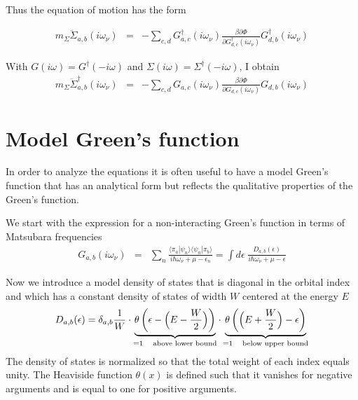\documentclass[11pt,a4paper]{report}
\begin{document}
Thus the equation of motion has the form

\begin{eqnarray*}
m_\Sigma
\ddot{\Sigma}_{a,b}(i\omega_\nu)
&=&-
\sum_{c,d}
G^\dagger_{a,c}(i\omega_\nu)
\frac{\beta\partial\Phi}{\partial G^\dagger_{d,c}(i\omega_\nu)}
G^\dagger_{d,b}(i\omega_\nu)
\end{eqnarray*}

With $G(i\omega)=G^\dagger(-i\omega)$ and
$\Sigma(i\omega)=\Sigma^\dagger(-i\omega)$, I obtain
\begin{eqnarray*}
m_\Sigma
\ddot{\Sigma}^\dagger_{a,b}(i\omega_\nu)
&=&-
\sum_{c,d}
G_{a,c}(i\omega_\nu)
\frac{\beta\partial\Phi}{\partial G_{d,c}(i\omega_\nu)}
G_{d,b}(i\omega_\nu)
\end{eqnarray*}


\section{Model Green's function}
In order to analyze the equations it is often useful to have a model
Green's function that has an analytical form but reflects the
qualitative properties of the Green's function.

We start with the expression for a non-interacting Green's
function in terms of Matsubara frequencies
\begin{eqnarray}
G_{a,b}(i\omega_\nu)
&=&
\sum_n\frac{\langle\pi_a|\psi_n\rangle
\langle\psi_n|\pi_b\rangle}{i\hbar\omega_\nu+\mu-\epsilon_n}
=
\int d\epsilon\;\frac{D_{a,b}(\epsilon)}{i\hbar\omega_\nu+\mu-\epsilon}
\end{eqnarray}

Now we introduce a model density of states that is diagonal in the
orbital index and which has a constant density of states of width $W$
centered at the energy $E$
\begin{eqnarray}
D_{a,b}(\epsilon)=\delta_{a,b}\frac{1}{W}
\cdot
\underbrace{\theta\left(\epsilon-\Bigl(E-\frac{W}{2}\Bigr)\right)
}_{=1\quad\text{above lower bound}}
\cdot\underbrace{
\theta\left(\Bigl(E+\frac{W}{2}\Bigr)-\epsilon\right)
}_{=1\quad\text{below upper bound}}
\end{eqnarray}
The density of states is normalized so that the total weight of each
index equals unity. The Heaviside function $\theta(x)$ is defined such
that it vanishes for negative arguments and is equal to one for
positive arguments.
\end{document}
